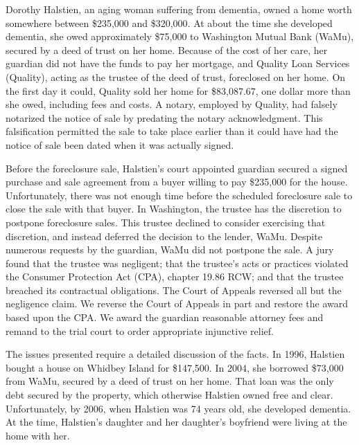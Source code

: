 

Dorothy Halstien, an aging woman suffering from dementia, owned a home
worth somewhere between \$235,000 and \$320,000. At about the time she
developed dementia, she owed approximately \$75,000 to Washington Mutual Bank
(WaMu), secured by a deed of trust
on her home. Because of the cost of her
care, her guardian did not have the funds to pay her mortgage, and Quality Loan
Services (Quality), acting as the trustee of the deed of trust, foreclosed on
her home. On the first day it could, Quality sold her home for \$83,087.67, one
dollar more than she owed, including fees and costs. A notary, employed by
Quality, had falsely notarized the notice of sale by predating the notary
acknowledgment. This falsification permitted the sale to take place earlier
than it could have had the notice of sale been dated when it was actually
signed.

Before the foreclosure sale, Halstien's court appointed guardian secured
a signed purchase and sale agreement from a buyer willing to pay \$235,000 for
the house. Unfortunately, there was not enough time before the scheduled
foreclosure sale to close the sale with that buyer. In Washington, the trustee
has the discretion to postpone foreclosure sales. This trustee declined to
consider exercising that discretion, and instead deferred the decision to the
lender, WaMu. Despite numerous requests by the guardian, WaMu did not postpone
the sale. A jury found that the trustee was negligent; that the trustee's acts
or practices violated the Consumer Protection Act (CPA), chapter 19.86 RCW; and
that the trustee breached its contractual obligations. The Court of Appeals
reversed all but the negligence claim. We reverse the Court of Appeals in part
and restore the award based upon the CPA. We award the guardian reasonable
attorney fees and remand to the trial court to order appropriate injunctive
relief.


The issues presented require a detailed discussion of the facts. In 1996,
Halstien bought a house on Whidbey Island for \$147,500. In 2004, she borrowed
\$73,000 from WaMu, secured by a deed of trust on her home. That loan was the
only debt secured by the property, which otherwise Halstien owned free and
clear. Unfortunately, by 2006, when Halstien was 74 years old, she developed
dementia. At the time, Halstien's daughter and her daughter's boyfriend were
living at the home with her.

